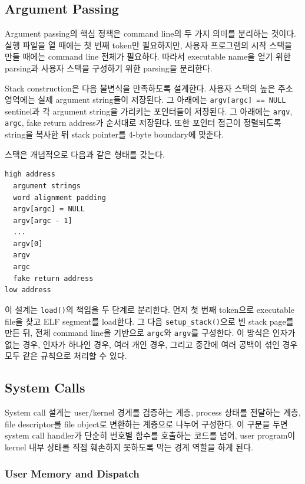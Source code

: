 \documentclass[conference]{IEEEtran}
\newcommand{\codefont}[1]{\texttt{\color{darkmagenta}#1}}
\begin{document}
\subsection{Argument Passing}

Argument passing의 핵심 정책은 command line의 두 가지 의미를 분리하는 것이다. 실행 파일을 열 때에는 첫 번째 token만 필요하지만, 사용자 프로그램의 시작 스택을 만들 때에는 command line 전체가 필요하다. 따라서 executable name을 얻기 위한 parsing과 사용자 스택을 구성하기 위한 parsing을 분리한다.

Stack construction은 다음 불변식을 만족하도록 설계한다. 사용자 스택의 높은 주소 영역에는 실제 argument string들이 저장된다. 그 아래에는 \codefont{argv[argc] == NULL} sentinel과 각 argument string을 가리키는 포인터들이 저장된다. 그 아래에는 \codefont{argv}, \codefont{argc}, fake return address가 순서대로 저장된다. 또한 포인터 접근이 정렬되도록 string을 복사한 뒤 stack pointer를 4-byte boundary에 맞춘다.

스택은 개념적으로 다음과 같은 형태를 갖는다.

\begin{lstlisting}[numbers=none]
high address
  argument strings
  word alignment padding
  argv[argc] = NULL
  argv[argc - 1]
  ...
  argv[0]
  argv
  argc
  fake return address
low address
\end{lstlisting}

이 설계는 \codefont{load()}의 책임을 두 단계로 분리한다. 먼저 첫 번째 token으로 executable file을 찾고 ELF segment를 load한다. 그 다음 \codefont{setup\_stack()}으로 빈 stack page를 만든 뒤, 전체 command line을 기반으로 \codefont{argc}와 \codefont{argv}를 구성한다. 이 방식은 인자가 없는 경우, 인자가 하나인 경우, 여러 개인 경우, 그리고 중간에 여러 공백이 섞인 경우 모두 같은 규칙으로 처리할 수 있다.

\subsection{System Calls}

System call 설계는 user/kernel 경계를 검증하는 계층, process 상태를 전달하는 계층, file descriptor를 file object로 변환하는 계층으로 나누어 구성한다. 이 구분을 두면 system call handler가 단순히 번호별 함수를 호출하는 코드를 넘어, user program이 kernel 내부 상태를 직접 훼손하지 못하도록 막는 경계 역할을 하게 된다.

\subsubsection{User Memory and Dispatch}
\end{document}

